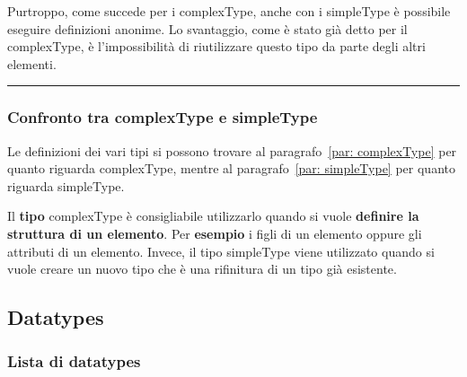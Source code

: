 \documentclass[a4paper]{article}
\newcommand{\longline}{\noindent\rule{\textwidth}{0.4pt}}
\begin{document}
	\noindent
	Purtroppo, come succede per i \textsf{complexType}, anche con i \textsf{simpleType} è possibile eseguire definizioni anonime. Lo svantaggio, come è stato già detto per il \textsf{complexType}, è l'impossibilità di riutilizzare questo tipo da parte degli altri elementi.
	
	\longline
	
	\subsubsection{Confronto tra \textsf{complexType} e \textsf{simpleType}}
	
	Le definizioni dei vari tipi si possono trovare al paragrafo~\ref{par: complexType} per quanto riguarda \textsf{complexType}, mentre al paragrafo~\ref{par: simpleType} per quanto riguarda \textsf{simpleType}.\newline
	
	\noindent
	Il \textbf{tipo} \textsf{complexType} è consigliabile utilizzarlo quando si vuole \textbf{definire la struttura di un elemento}. Per \textcolor{Green4}{\textbf{esempio}} i figli di un elemento oppure gli attributi di un elemento. Invece, il tipo \textsf{simpleType} viene utilizzato quando si vuole creare un nuovo tipo che è una rifinitura di un tipo già esistente.
	
	\newpage
	
	\subsection{Datatypes}
	
	\subsubsection{Lista di datatypes}
	
\end{document}
